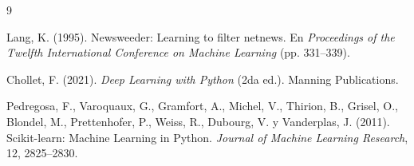 \documentclass[12pt, a4paper]{article}
\begin{document}
\newpage
\begin{thebibliography}{9}

Lang, K. (1995).
Newsweeder: Learning to filter netnews.
En \textit{Proceedings of the Twelfth International Conference on Machine Learning} (pp. 331--339).

Chollet, F. (2021).
\textit{Deep Learning with Python} (2da ed.).
Manning Publications.

Pedregosa, F., Varoquaux, G., Gramfort, A., Michel, V., Thirion, B., Grisel, O., Blondel, M., Prettenhofer, P., Weiss, R., Dubourg, V. y Vanderplas, J. (2011).
Scikit-learn: Machine Learning in Python.
\textit{Journal of Machine Learning Research}, 12, 2825--2830.


\end{thebibliography}
\end{document}
